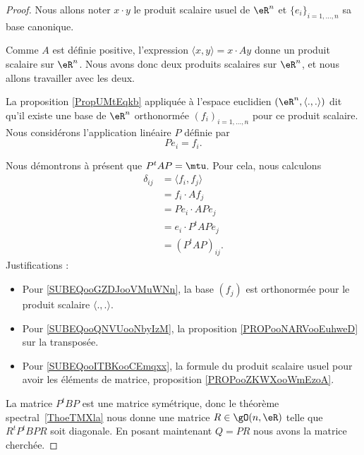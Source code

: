 \begin{proof}
    Nous allons noter \( x\cdot y\) le produit scalaire usuel de \( \eR^n\) et \( \{ e_i \}_{i=1,\ldots, n}\) sa base canonique.

    Comme \( A\) est définie positive, l'expression \( \langle x, y\rangle =x\cdot Ay\) donne un produit scalaire sur \( \eR^n\). Nous avons donc deux produits scalaires sur \( \eR^n\), et nous allons travailler avec les deux.

    La proposition \ref{PropUMtEqkb} appliquée à l'espace euclidien \( (\eR^n,\langle ., .\rangle )\) dit qu'il existe une base de \( \eR^n\) orthonormée \( (f_i )_{i=1,\ldots, n}\) pour ce produit scalaire. Nous considérons l'application linéaire \( P\) définie par
    \begin{equation}
        Pe_i=f_i.
    \end{equation}

    Nous démontrons à présent que \( P^tAP=\mtu\). Pour cela, nous calculons
    \begin{subequations}
        \begin{align}
            \delta_{ij} & =\langle f_i, f_j\rangle    \label{SUBEQooGZDJooVMuWNn} \\
                        & =f_i\cdot Af_j          \\
                        & =Pe_i\cdot APe_j        \\
                        & =e_i\cdot P^tAPe_j      \label{SUBEQooQNVUooNbyIzM}     \\
                        & =(P^tAP)_{ij}.          \label{SUBEQooITBKooCEmqxx}
        \end{align}
    \end{subequations}
    Justifications :
    \begin{itemize}
        \item Pour \eqref{SUBEQooGZDJooVMuWNn}, la base \( (f_j)\) est orthonormée pour le produit scalaire \( \langle ., .\rangle \).
        \item Pour \eqref{SUBEQooQNVUooNbyIzM}, la proposition \ref{PROPooNARVooEuhweD} sur la transposée.
        \item Pour \eqref{SUBEQooITBKooCEmqxx}, la formule du produit scalaire usuel pour avoir les éléments de matrice, proposition \ref{PROPooZKWXooWmEzoA}.
    \end{itemize}
    La matrice \( P^tBP\) est une matrice symétrique, donc le théorème spectral~\ref{ThoeTMXla} nous donne une matrice \( R\in \gO(n,\eR)\) telle que \( R^tP^tBPR\) soit diagonale. En posant maintenant \( Q=PR\) nous avons la matrice cherchée.
\end{proof}

